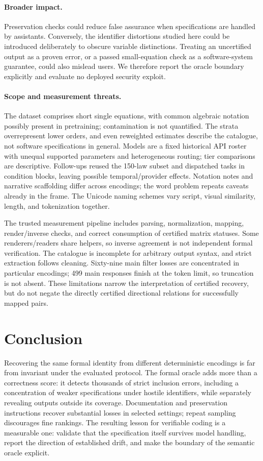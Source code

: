 \documentclass{article}
\begin{document}
\paragraph{Broader impact.}
Preservation checks could reduce false assurance when specifications are handled
by assistants. Conversely, the identifier distortions studied here could be
introduced deliberately to obscure variable distinctions. Treating an
uncertified output as a proven error, or a passed small-equation check as a
software-system guarantee, could also mislead users. We therefore report the
oracle boundary explicitly and evaluate no deployed security exploit.

\paragraph{Scope and measurement threats.}
The dataset comprises short single equations, with common algebraic notation
possibly present in pretraining; contamination is not quantified. The strata
overrepresent lower orders, and even reweighted estimates describe the
catalogue, not software specifications in general. Models are a fixed historical
API roster with unequal supported parameters and heterogeneous routing; tier
comparisons are descriptive. Follow-ups reused the 150-law subset and dispatched
tasks in condition blocks, leaving possible temporal/provider effects.
Notation notes and narrative scaffolding differ across encodings; the word
problem repeats caveats already in the frame. The Unicode naming schemes vary
script, visual similarity, length, and tokenization together.

The trusted measurement pipeline includes parsing, normalization, mapping,
render/inverse checks, and correct consumption of certified matrix statuses.
Some renderers/readers share helpers, so inverse agreement is not independent
formal verification. The catalogue is incomplete for arbitrary output syntax,
and strict extraction follows cleaning. Sixty-nine main filter losses are
concentrated in particular encodings; 499 main responses finish at the token
limit, so truncation is not absent. These limitations narrow the interpretation
of certified recovery, but do not negate the directly certified directional
relations for successfully mapped pairs.

\section{Conclusion}

Recovering the same formal identity from different deterministic encodings is
far from invariant under the evaluated protocol. The formal oracle adds more
than a correctness score: it detects thousands of strict inclusion errors,
including a concentration of weaker specifications under hostile identifiers,
while separately revealing outputs outside its coverage. Documentation and
preservation instructions recover substantial losses in selected settings;
repeat sampling discourages fine rankings. The resulting lesson for verifiable
coding is a measurable one: validate that the specification itself survives
model handling, report the direction of established drift, and make the boundary
of the semantic oracle explicit.
\end{document}
